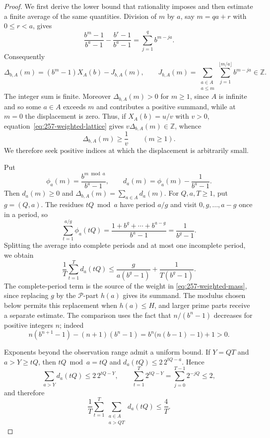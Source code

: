 \begin{proof}
We first derive the lower bound that rationality imposes and then
estimate a finite average of the same quantities. Division of $m$ by $a$, say $m=qa+r$ with
$0\le r<a$, gives
\[
 \frac{b^m-1}{b^a-1}-\frac{b^r-1}{b^a-1}
   =\sum_{j=1}^{q}b^{m-ja}.
\]
Consequently
\begin{equation}\label{eq:257-weighted-lattice}
 \Delta_{b,A}(m)=(b^m-1)X_A(b)-J_{b,A}(m),
 \qquad
 J_{b,A}(m)=
 \sum_{\substack{a\in A\\a\le m}}
 \sum_{j=1}^{\lfloor m/a\rfloor}b^{m-ja}\in\mathbb Z.
\end{equation}
The integer sum is finite. Moreover $\Delta_{b,A}(m)>0$ for $m\ge1$,
since $A$ is infinite and so some $a\in A$ exceeds $m$ and contributes a
positive summand, while at $m=0$ the displacement is zero. Thus, if
$X_A(b)=u/v$ with $v>0$, equation~\eqref{eq:257-weighted-lattice} gives
$v\Delta_{b,A}(m)\in\mathbb Z$, whence
\begin{equation}\label{eq:257-weighted-gap}
 \Delta_{b,A}(m)\ge \frac1v\qquad(m\ge1).
\end{equation}
We therefore seek positive indices at which the displacement is
arbitrarily small.

Put
\[
 \phi_a(m)=\frac{b^{m\bmod a}}{b^a-1},
 \qquad
 d_a(m)=\phi_a(m)-\frac1{b^a-1}.
\]
Then $d_a(m)\ge0$ and $\Delta_{b,A}(m)=\sum_{a\in A}d_a(m)$.
For $Q,a,T\ge1$, put $g=(Q,a)$.  The residues $tQ\bmod a$ have period
$a/g$ and visit $0,g,\ldots,a-g$ once in a period, so
\[
 \sum_{t=1}^{a/g}\phi_a(tQ)
 =\frac{1+b^g+\cdots+b^{a-g}}{b^a-1}
 =\frac1{b^g-1}.
\]
Splitting the average into complete periods and at most one incomplete
period, we obtain
\begin{equation}\label{eq:257-weighted-gcd-average}
 \frac1T\sum_{t=1}^{T}d_a(tQ)
 \le \frac{g}{a(b^g-1)}+\frac1{T(b^g-1)}.
\end{equation}
The complete-period term is the source of the weight in
\eqref{eq:257-weighted-mass}, since replacing $g$ by the $\mathcal P$-part
$h(a)$ gives its summand. The modulus chosen below permits this
replacement when $h(a)\le H$, and larger prime parts receive a separate
estimate. The comparison uses the fact that $n/(b^n-1)$ decreases for
positive integers $n$; indeed
\[
 n(b^{n+1}-1)-(n+1)(b^n-1)
 =b^n\bigl(n(b-1)-1\bigr)+1>0.
\]

Exponents beyond the observation range admit a uniform bound. If
$Y=QT$ and $a>Y\ge tQ$, then $tQ\bmod a=tQ$ and
$d_a(tQ)\le2\,2^{tQ-a}$.  Hence
\[
 \sum_{a>Y}d_a(tQ)\le2\,2^{tQ-Y},
 \qquad
 \sum_{t=1}^{T}2^{tQ-Y}
 =\sum_{j=0}^{T-1}2^{-jQ}\le2,
\]
and therefore
\begin{equation}\label{eq:257-weighted-outer}
 \frac1T\sum_{t=1}^{T}
 \sum_{\substack{a\in A\\a>QT}}d_a(tQ)\le\frac4T.
\end{equation}


\end{proof}
